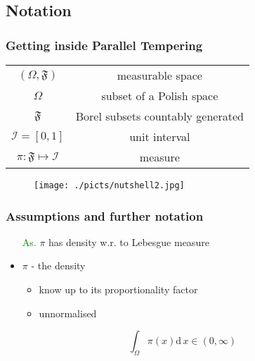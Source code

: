 		\subsection{Notation}


\begin{frame}
		\frametitle{Getting inside Parallel Tempering}
	
	\begin{center}
	\begin{tabular}{cc}
		$(\Omega, \mathfrak{F})$ & measurable space \\ 
		 
		$\Omega$ & subset of a Polish space \\ 
		 
		$\mathfrak{F}$ & Borel subsets countably generated\\ 
		 
		$\mathcal{I} = [0,1]$ & unit interval \\ 
		 
		$ \pi: \mathfrak{F} \mapsto \mathcal{I}$ & measure \\ 
	\end{tabular} 	


		\begin{figure}\texttt{[image: ./picts/nutshell2.jpg]}\end{figure}	
	\end{center}

\end{frame}



\begin{frame}
		\frametitle{Assumptions and further notation}
	
	\begin{itemize}
		\item[\textcolor{green}{As.}] $\pi$ has density w.r. to Lebesgue measure
		\item $\pi$ - the density
		\begin{itemize}
			\item know up to its proportionality factor
			\item unnormalised
		\end{itemize}
	\end{itemize}	

	 $$ \int_{\Omega} \pi(x) \mathrm{d}\, x \in (0, \infty) $$
\end{frame}


